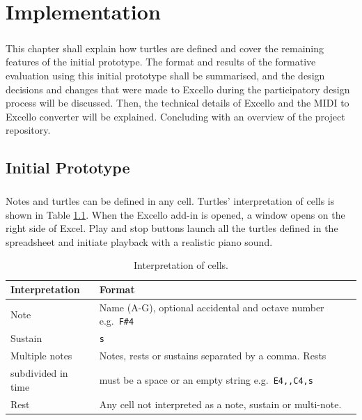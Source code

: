 
\chapter{Implementation}

\paragraph{} This chapter shall explain how turtles are defined and cover the remaining features of the initial prototype. The format and results of the formative evaluation using this initial prototype shall be summarised, and the design decisions and changes that were made to Excello during the participatory design process will be discussed. Then, the technical details of Excello and the MIDI to Excello converter will be explained. Concluding with an overview of the project repository.

\section{Initial Prototype}

\paragraph{} Notes and turtles can be defined in any cell. Turtles' interpretation of cells is shown in Table \ref{tab:cells}. When the Excello add-in is opened, a window opens on the right side of Excel. Play and stop buttons launch all the turtles defined in the spreadsheet and initiate playback with a realistic piano sound.

\begin{table}[htb]
\centering
\vspace{1pt}
\begin{tabular}{|l|l|} \hline
\textbf{Interpretation}&\textbf{Format}\\ \hline
Note& Name (A-G), optional accidental and octave number e.g.~\texttt{F\#4}\\ \hline
Sustain& \texttt{s}\\ \hline
Multiple notes& Notes, rests or sustains separated by a comma. Rests \\
subdivided in time& must be a space or an empty string e.g.~\texttt{E4,,C4,s}\\ \hline
Rest& Any cell not interpreted as a note, sustain or multi-note. \\ \hline
\end{tabular}
\caption{Interpretation of cells.\label{tab:cells}}
\end{table}

